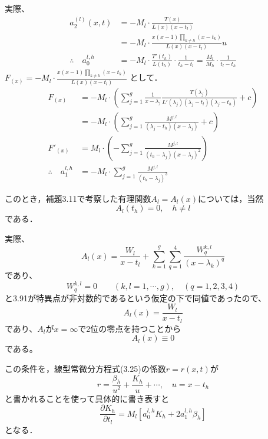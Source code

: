 \documentclass[paper=a4, fontsize=11pt]{jlreq} %
\newenvironment{story}{%
  \begin{mdframed}[
    backgroundcolor=red!5, %
    linewidth=0pt,         %
    innertopmargin=10pt,   %
    innerbottommargin=10pt,
    innerrightmargin=10pt, %
    innerleftmargin=10pt
  ]%
}{%
  \end{mdframed}%
}
\theoremstyle{break}
\theoremstyle{qa}
\begin{document}
実際、
\begin{align*}
    a_2^{(l)} (x,t) &= - M_l \cdot \frac{T(x)}{L(x)(x-t_l)} \\
    &= - M_l \cdot \frac{x(x-1)\prod_{k \neq h}(x-t_k)}{L(x)(x-t_l)} u \\
    \therefore \quad a_0^{l,h} &= - M_l \cdot \frac{T'(t_h)}{L(t_h)} \cdot \frac{1}{t_h - t_l} = \frac{M_l}{M_h} \cdot \frac{1}{t_l - t_h}
\end{align*}
$F_{(x)} = \displaystyle - M_l \cdot \frac{x(x-1)\prod_{k \neq h}(x-t_k)}{L(x)(x-t_l)}$ として．
\begin{align*}
    F_{(x)} &= - M_l \cdot \left( \sum_{j=1}^g \frac{1}{x-\lambda_j} \frac{T(\lambda_j)}{L'(\lambda_j) (\lambda_j-t_l) (\lambda_j-t_h)} + c \right) \\
    &= - M_l \cdot \left( \sum_{j=1}^g \frac{M^{j,l}}{(\lambda_j-t_h)(x-\lambda_j)} + c \right) \\
    F'_{(x)} &= M_l \cdot \left( - \sum_{j=1}^g \frac{M^{j,l}}{(t_h-\lambda_j)(x-\lambda_j)^2} \right) \\
    \therefore \quad a_1^{l,h} &= - M_l \cdot \sum_{j=1}^g \frac{M^{j,l}}{(t_h-\lambda_j)^3}
\end{align*}
\begin{story}
このとき，補題3.11で考察した有理関数$A_l = A_l(x)$については，当然
\begin{equation*}
    A_l(t_h) = 0, \quad h \neq l
\end{equation*}
である．
\end{story}
実際、
\[
A_l(x) = \frac{W_l}{x-t_l} + \sum_{k=1}^g \sum_{q=1}^4 \frac{W_q^{k,l}}{(x-\lambda_k)^q}
\]
であり、
\begin{equation} \tag{3.93}
W_q^{k,l} = 0 \qquad (k, l = 1, \cdots, g), \quad (q = 1, 2, 3, 4)
\end{equation}
と3.91が特異点が非対数的であるという仮定の下で同値であったので、
\[
A_l(x) = \frac{W_l}{x-t_l}
\]
であり、$A_l$が$x=\infty$で2位の零点を持つことから
\[
A_{l}(x)\equiv 0
\]
である。
\begin{story}
この条件を，線型常微分方程式(3.25)の係数$r = r(x,t)$が
\begin{equation*}
    r = \frac{\beta_h}{u^2} + \frac{K_h}{u} + \cdots, \quad u = x - t_h
\end{equation*}
と書かれることを使って具体的に書き表すと
\begin{equation*}
    \frac{\partial K_h}{\partial t_l} = M_l \left[ a_0^{l,h} K_h + 2 a_1^{l,h} \beta_h \right]
\end{equation*}
となる．
\end{story}
\end{document}
